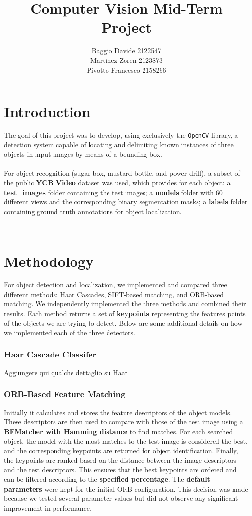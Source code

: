 \documentclass[10.5pt,a4paper]{article}
\title{Computer Vision Mid-Term Project}
\author{Baggio Davide 2122547 \\ Martinez Zoren 2123873 \\ Pivotto Francesco 2158296}
\date{}
\begin{document}
\maketitle

\section*{Introduction}

The goal of this project was to develop, using exclusively the \texttt{OpenCV} library, a detection system capable of locating and delimiting known instances of three objects in input images by means of a bounding box.
\\\\
For object recognition (sugar box, mustard bottle, and power drill), a subset of the public \textbf{YCB Video} dataset was used, which provides for each object:
a \textbf{test\_images} folder containing the test images; a \textbf{models} folder with 60 different views and the corresponding binary segmentation masks; a \textbf{labels} folder containing ground truth annotations for object localization.

\\

\section*{Methodology}

For object detection and localization, we implemented and compared three different methods: Haar Cascades, SIFT-based matching, and ORB-based matching. We independently implemented the three methods and combined their results. Each method returns a set of \textbf{keypoints} representing the features points of the objects we are trying to detect. Below are some additional details on how we implemented each of the three detectors.

\subsubsection*{Haar Cascade Classifer}
    Aggiungere qui qualche dettaglio su Haar
\subsubsection*{ORB-Based Feature Matching}
    Initially it calculates and stores the feature descriptors of the object models. These descriptors are then used to compare with those of the test image using a \textbf{BFMatcher with Hamming distance} to find matches. For each searched object, the model with the most matches to the test image is considered the best, and the corresponding keypoints are returned for object identification. Finally, the keypoints are ranked based on the distance between the image descriptors and the test descriptors. This ensures that the best keypoints are ordered and can be filtered according to the \textbf{specified percentage}. The \textbf{default parameters} were kept for the initial ORB configuration. This decision was made because we tested several parameter values but did not observe any significant improvement in performance.
\end{document}
